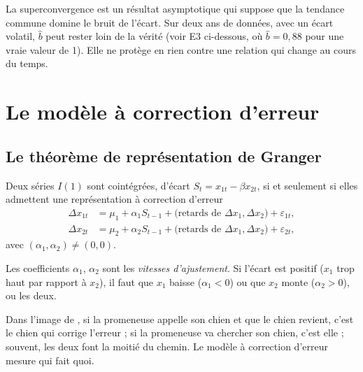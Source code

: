 \begin{pitfall}
La superconvergence est un résultat asymptotique qui suppose que la tendance commune domine le bruit de l'écart. Sur deux ans de données, avec un écart volatil, $\hat b$ peut rester loin de la vérité (voir E3 ci-dessous, où $\hat b = 0{,}88$ pour une vraie valeur de 1). Elle ne protège en rien contre une relation qui change au cours du temps.
\end{pitfall}

\section{Le modèle à correction d'erreur}

\subsection{Le théorème de représentation de Granger}

\begin{theorem}
Deux séries $I(1)$ sont cointégrées, d'écart $S_t = x_{1t} - \beta x_{2t}$, si et seulement si elles admettent une représentation à correction d'erreur
\begin{align*}
\Delta x_{1t} &= \mu_1 + \alpha_1 S_{t-1} + \text{(retards de } \Delta x_1, \Delta x_2) + \varepsilon_{1t},\\
\Delta x_{2t} &= \mu_2 + \alpha_2 S_{t-1} + \text{(retards de } \Delta x_1, \Delta x_2) + \varepsilon_{2t},
\end{align*}
avec $(\alpha_1,\alpha_2)\ne(0,0)$.
\end{theorem}

Les coefficients $\alpha_1$, $\alpha_2$ sont les \emph{vitesses d'ajustement}. Si l'écart est positif ($x_1$ trop haut par rapport à $x_2$), il faut que $x_1$ baisse ($\alpha_1<0$) ou que $x_2$ monte ($\alpha_2>0$), ou les deux.

\begin{intuition}
Dans l'image de \citet{murray1994}, si la promeneuse appelle son chien et que le chien revient, c'est le chien qui \og corrige l'erreur\fg{} ; si la promeneuse va chercher son chien, c'est elle ; souvent, les deux font la moitié du chemin. Le modèle à correction d'erreur mesure qui fait quoi.
\end{intuition}

